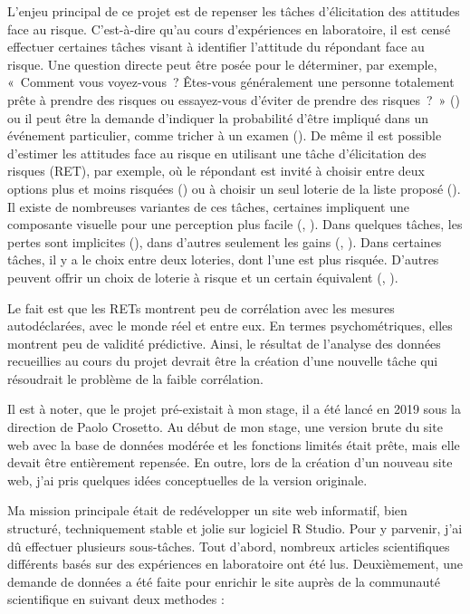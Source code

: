 \documentclass[12pt]{article}
\begin{document}
L'enjeu principal de ce projet est de repenser les tâches d'élicitation
des attitudes face au risque. C'est-à-dire qu'au cours d'expériences en
laboratoire, il est censé effectuer certaines tâches visant à identifier
l'attitude du répondant face au risque. Une question directe peut être
posée pour le déterminer, par exemple, «~Comment vous voyez-vous~?
Êtes-vous généralement une personne totalement prête à prendre des
risques ou essayez-vous d'éviter de prendre des risques~?~»
(\citet{SOEP2007}) ou il peut être la demande d'indiquer la probabilité
d'être impliqué dans un événement particulier, comme tricher à un examen
(\citet{Blais2006}). De même il est possible d'estimer les attitudes
face au risque en utilisant une tâche d'élicitation des risques (RET),
par exemple, où le répondant est invité à choisir entre deux options
plus et moins risquées (\citet{Holt2002}) ou à choisir un seul loterie
de la liste proposé (\citet{Eckel2002}). Il existe de nombreuses
variantes de ces tâches, certaines impliquent une composante visuelle
pour une perception plus facile (\citet{Hunt2005},
\citet{Crosetto2013}). Dans quelques tâches, les pertes sont implicites
(\citet{Menkhoff_Sakha_2017}), dans d'autres seulement les gains
(\citet{Eckel2002}, \citet{Holt2002}). Dans certaines tâches, il y a le
choix entre deux loteries, dont l'une est plus risquée. D'autres peuvent
offrir un choix de loterie à risque et un certain équivalent
(\citet{Menkhoff_Sakha_2017}, \citet{Csermely2014}).

Le fait est que les RETs montrent peu de corrélation avec les mesures
autodéclarées, avec le monde réel et entre eux. En termes
psychométriques, elles montrent peu de validité prédictive. Ainsi, le
résultat de l'analyse des données recueillies au cours du projet devrait
être la création d'une nouvelle tâche qui résoudrait le problème de la
faible corrélation.

Il est à noter, que le projet pré-existait à mon stage, il a été lancé
en 2019 sous la direction de Paolo Crosetto. Au début de mon stage, une
version brute du site web avec la base de données modérée et les
fonctions limités était prête, mais elle devait être entièrement
repensée. En outre, lors de la création d'un nouveau site web, j'ai pris
quelques idées conceptuelles de la version originale.

Ma mission principale était de redévelopper un site web informatif, bien
structuré, techniquement stable et jolie sur logiciel R Studio. Pour y
parvenir, j'ai dû effectuer plusieurs sous-tâches. Tout d'abord,
nombreux articles scientifiques différents basés sur des expériences en
laboratoire ont été lus. Deuxièmement, une demande de données a été
faite pour enrichir le site auprès de la communauté scientifique en
suivant deux methodes :
\end{document}
